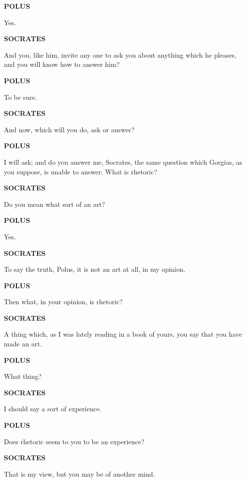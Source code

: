 \documentclass[11pt,letter]{article}
\begin{document}
\par \textbf{POLUS}
\par   Yes.

\par \textbf{SOCRATES}
\par   And you, like him, invite any one to ask you about anything which he pleases, and you will know how to answer him?

\par \textbf{POLUS}
\par   To be sure.

\par \textbf{SOCRATES}
\par   And now, which will you do, ask or answer?

\par \textbf{POLUS}
\par   I will ask; and do you answer me, Socrates, the same question which Gorgias, as you suppose, is unable to answer:  What is rhetoric?

\par \textbf{SOCRATES}
\par   Do you mean what sort of an art?

\par \textbf{POLUS}
\par   Yes.

\par \textbf{SOCRATES}
\par   To say the truth, Polus, it is not an art at all, in my opinion.

\par \textbf{POLUS}
\par   Then what, in your opinion, is rhetoric?

\par \textbf{SOCRATES}
\par   A thing which, as I was lately reading in a book of yours, you say that you have made an art.

\par \textbf{POLUS}
\par   What thing?

\par \textbf{SOCRATES}
\par   I should say a sort of experience.

\par \textbf{POLUS}
\par   Does rhetoric seem to you to be an experience?

\par \textbf{SOCRATES}
\par   That is my view, but you may be of another mind.
\end{document}
